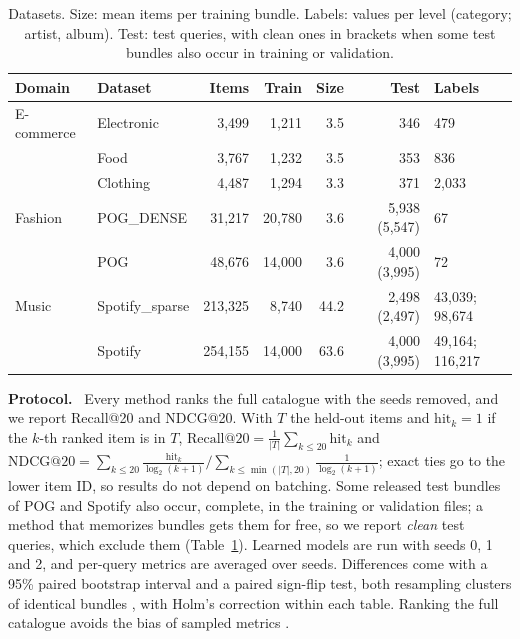 \documentclass[runningheads]{llncs}
\renewcommand{\paragraph}[1]{\smallskip\noindent\textbf{#1}\ }
\begin{document}
\begin{table}[t]
\centering
\caption{Datasets. Size: mean items per training bundle. Labels: values per level (category; artist, album).
Test: test queries, with clean ones in brackets when some test bundles also occur in training or validation.}
\label{tab:data}
\setlength{\tabcolsep}{3pt}
\small
\begin{tabular}{llrrrrl}
\toprule
Domain & Dataset & Items & Train & Size & Test & Labels\\
\midrule
E-commerce & Electronic & 3,499 & 1,211 & 3.5 & 346 & 479\\
 & Food & 3,767 & 1,232 & 3.5 & 353 & 836\\
 & Clothing & 4,487 & 1,294 & 3.3 & 371 & 2,033\\
Fashion & POG\_DENSE & 31,217 & 20,780 & 3.6 & 5,938 (5,547) & 67\\
 & POG & 48,676 & 14,000 & 3.6 & 4,000 (3,995) & 72\\
Music & Spotify\_sparse & 213,325 & 8,740 & 44.2 & 2,498 (2,497) & 43,039; 98,674\\
 & Spotify & 254,155 & 14,000 & 63.6 & 4,000 (3,995) & 49,164; 116,217\\
\bottomrule
\end{tabular}
\end{table}

\paragraph{Protocol.} Every method ranks the full catalogue with the seeds removed, and we report Recall@20 and
NDCG@20. With $T$ the held-out items and $\mathrm{hit}_k=1$ if the $k$-th ranked item is in $T$,
$\mathrm{Recall@20}=\frac{1}{|T|}\sum_{k\le20}\mathrm{hit}_k$ and
$\mathrm{NDCG@20}=\sum_{k\le20}\frac{\mathrm{hit}_k}{\log_2(k+1)}\big/\sum_{k\le\min(|T|,20)}\frac{1}{\log_2(k+1)}$;
exact ties go to the lower item ID, so results do not depend on batching. Some released test bundles of POG and Spotify also occur, complete, in the training or validation files; a
method that memorizes bundles gets them for free, so we report \emph{clean} test queries, which exclude them
(Table~\ref{tab:data}). Learned models are run with seeds 0, 1 and 2, and per-query metrics are averaged over seeds.
Differences come with a 95\% paired bootstrap interval and a paired sign-flip test, both resampling clusters of
identical bundles \cite{efron1993,smucker2007}, with Holm's correction \cite{holm1979} within each table. Ranking
the full catalogue avoids the bias of sampled metrics \cite{krichene2020}.
\end{document}
